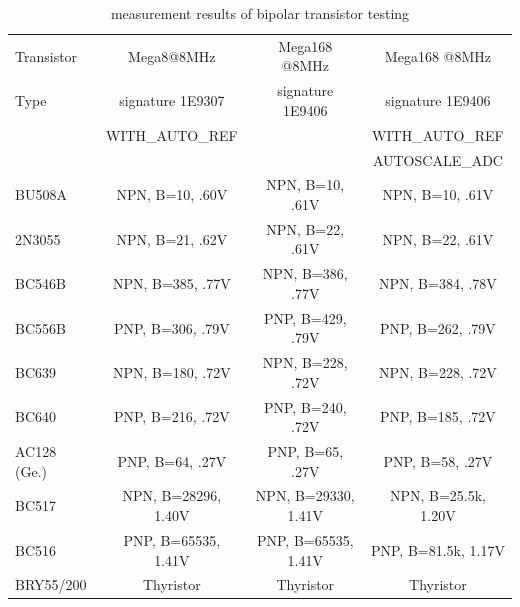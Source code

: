 \begin{table}[H]
  \begin{center}
    \begin{tabular}{| l | c | c | c |}
    \hline
     Transistor & Mega8@8MHz & Mega168 @8MHz & Mega168 @8MHz \\
     Type   & signature 1E9307 & signature 1E9406 & signature 1E9406 \\
           & WITH\_AUTO\_REF &  & WITH\_AUTO\_REF \\
           &                 &  & AUTOSCALE\_ADC \\
    \hline
    \hline
BU508A & NPN, B=10, .60V & NPN, B=10, .61V & NPN, B=10, .61V\\
    \hline
2N3055 & NPN, B=21, .62V & NPN, B=22, .61V & NPN, B=22, .61V\\
    \hline
BC546B & NPN, B=385, .77V & NPN, B=386, .77V & NPN, B=384, .78V\\
    \hline
BC556B & PNP, B=306, .79V & PNP, B=429, .79V & PNP, B=262, .79V\\
    \hline
BC639 & NPN, B=180, .72V & NPN, B=228, .72V & NPN, B=228, .72V\\

    \hline
BC640 & PNP, B=216, .72V & PNP, B=240, .72V & PNP, B=185, .72V\\
    \hline
AC128 (Ge.) & PNP, B=64, .27V & PNP, B=65, .27V & PNP, B=58, .27V\\
    \hline
BC517 & NPN, B=28296, 1.40V & NPN, B=29330, 1.41V & NPN, B=25.5k, 1.20V\\
    \hline
BC516 & PNP, B=65535, 1.41V & PNP, B=65535, 1.41V & PNP, B=81.5k, 1.17V\\
    \hline
BRY55/200 & Thyristor & Thyristor & Thyristor\\
    \hline
    \end{tabular}
  \end{center}
  \caption{measurement results of bipolar transistor testing}
  \label{tab:bipolar} 
\end{table}

